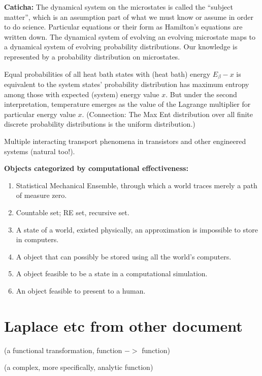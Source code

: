 \documentclass{article}
\begin{document}
\textbf{Caticha:} The dynamical system on the microstates is called
the ``subject matter'', which is an assumption part of what we must know or 
assume
in order to do science.  Particular equations or their form as
Hamilton's equations are written down.
The dynamical system of evolving an evolving 
microstate maps to a dynamical system of evolving probability 
distributions.  Our knowledge is represented by a probability distribution
on microstates.  

Equal probabilities of all heat bath states with (heat bath) energy 
$E_\beta -x$ is 
equivalent to the system states' probability distribution has maximum
entropy among those with expected (system) energy value $x$.  But under the
second interpretation, temperature emerges as the value of the Lagrange 
multiplier for particular energy value $x$.  (Connection: The Max Ent
distribution over all finite discrete probability distributions is the uniform
distribution.)  



Multiple interacting transport phenomena in transistors and other 
engineered systems (natural too!).
 
\textbf{Objects categorized by computational effectiveness:}
\begin{enumerate}
\item Statistical Mechanical Ensemble, through which a world traces
merely a path of measure zero.
\item Countable set; RE set, recursive set.
\item A state of a world, existed physically, an approximation is 
impossible to store in computers.
\item A object that can possibly be stored using all the world's 
computers.
\item A object feasible to be a state in a computational simulation.
\item An object feasible to present to a human.
\end{enumerate}

 



\section{Laplace etc from other document}


(a functional transformation, function $->$ function)

(a complex, more specifically, analytic function)
\end{document}
